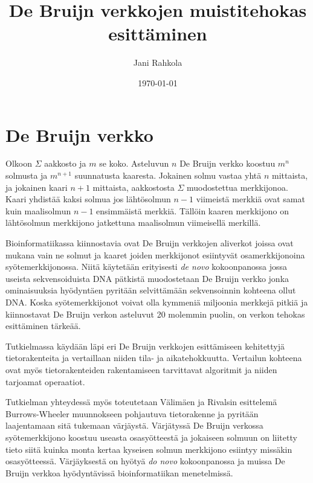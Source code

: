 \documentclass[finnish]{tktltiki2}
\title{De Bruijn verkkojen muistitehokas esittäminen}
\author{Jani Rahkola}
\date{\today}
\theoremstyle{definition}
\theoremstyle{remark}
\begin{document}

\frontmatter      %

\maketitle        %
\makeabstract     %

\tableofcontents  %


\mainmatter       %

\section{De Bruijn verkko}

Olkoon \(\Sigma\) aakkosto ja \(m\) se koko. Asteluvun \(n\) De Bruijn verkko
koostuu \(m^n\) solmusta ja \(m^{n+1}\) suunnatusta kaaresta. Jokainen solmu
vastaa yhtä \(n\) mittaista, ja jokainen kaari \(n + 1\) mittaista,
aakkostosta \(\Sigma\) muodostettua merkkijonoa. Kaari yhdistää kaksi solmua
jos lähtösolmun \(n - 1\) viimeistä merkkiä ovat samat kuin maalisolmun \(n -
1\) ensimmäistä merkkiä. Tällöin kaaren merkkijono on lähtösolmun merkkijono
jatkettuna maalisolmun viimeisellä merkillä.

Bioinformatiikassa kiinnostavia ovat De Bruijn verkkojen aliverkot joissa ovat
mukana vain ne solmut ja kaaret joiden merkkijonot esiintyvät osamerkkijonoina
syötemerkkijonossa. Niitä käytetään erityisesti \textit{de novo} kokoonpanossa
jossa useista sekvensoiduista DNA pätkistä muodostetaan De Bruijn verkko jonka
ominaisuuksia hyödyntäen pyritään selvittämään sekvensoinnin kohteena ollut
DNA. Koska syötemerkkijonot voivat olla kymmeniä miljoonia merkkejä pitkiä ja
kiinnostavat De Bruijn verkon asteluvut 20 molemmin puolin, on verkon tehokas
esittäminen tärkeää.

Tutkielmassa käydään läpi eri De Bruijn verkkojen esittämiseen kehitettyjä
tietorakenteita ja vertaillaan niiden tila- ja aikatehokkuutta. Vertailun
kohteena ovat myös tietorakenteiden rakentamiseen tarvittavat algoritmit ja
niiden tarjoamat operaatiot.

Tutkielman yhteydessä myös toteutetaan Välimäen ja Rivalsin esittelemä
Burrows-Wheeler muunnokseen pohjautuva tietorakenne ja pyritään laajentamaan
sitä tukemaan värjäystä. Värjätyssä De Bruijn verkossa syötemerkkijono koostuu
useasta osasyötteestä ja jokaiseen solmuun on liitetty tieto siitä kuinka
monta kertaa kyseisen solmun merkkijono esiintyy missäkin osasyötteessä.
Värjäyksestä on hyötyä \textit{do novo} kokoonpanossa ja muissa De Bruijn
verkkoa hyödyntävissä bioinformatiikan menetelmissä.
\end{document}
